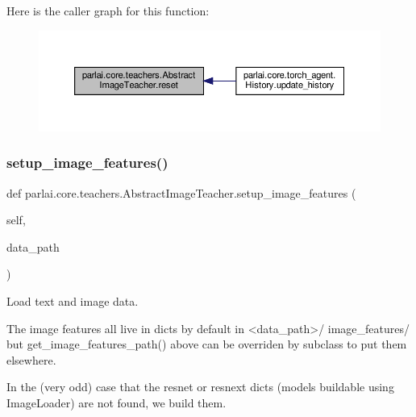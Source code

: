 Here is the caller graph for this function\+:
\nopagebreak
\begin{figure}[H]
\begin{center}
\leavevmode
\includegraphics[width=350pt]{classparlai_1_1core_1_1teachers_1_1AbstractImageTeacher_a13b4576dd3a045944ff1b44cb88a2764_icgraph}
\end{center}
\end{figure}
\mbox{\label{classparlai_1_1core_1_1teachers_1_1AbstractImageTeacher_aa6ac386d509d428870124c27265363bb}} 
\subsubsection{\texorpdfstring{setup\+\_\+image\+\_\+features()}{setup\_image\_features()}}
{\footnotesize\ttfamily def parlai.\+core.\+teachers.\+Abstract\+Image\+Teacher.\+setup\+\_\+image\+\_\+features (\begin{DoxyParamCaption}\item[{}]{self,  }\item[{}]{data\+\_\+path }\end{DoxyParamCaption})}

\begin{DoxyVerb}Load text and image data.

The image features all live in dicts by default in <data_path>/
image_features/ but get_image_features_path() above can be overriden by
subclass to put them elsewhere.

In the (very odd) case that the resnet or resnext dicts (models
buildable using ImageLoader) are not found, we build them.
\end{DoxyVerb}
 

